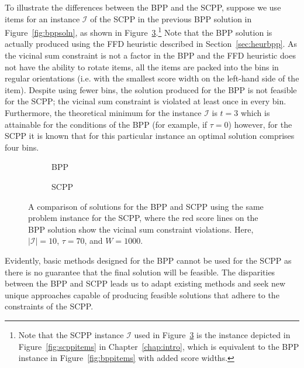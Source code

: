 \documentclass[a4paper,11pt]{article}
\begin{document}
To illustrate the differences between the BPP and the SCPP, suppose we use items for an instance $\mathcal{I}$ of the SCPP in the previous BPP solution in Figure~\ref{fig:bppsoln}, as shown in Figure~\ref{fig:bppvscpp}.\footnote{Note that the SCPP instance $\mathcal{I}$ used in Figure~\ref{fig:bppvscpp} is the instance depicted in Figure~\ref{fig:scppitems} in Chapter~\ref{chap:intro}, which is equivalent to the BPP instance in Figure~\ref{fig:bppitems} with added score widths.} Note that the BPP solution is actually produced using the FFD heuristic described in Section~\ref{sec:heurbpp}. As the vicinal sum constraint is not a factor in the BPP and the FFD heuristic does not have the ability to rotate items, all the items are packed into the bins in regular orientations (i.e. with the smallest score width on the left-hand side of the item). Despite using fewer bins, the solution produced for the BPP is not feasible for the SCPP; the vicinal sum constraint is violated at least once in every bin. Furthermore, the theoretical minimum for the instance $\mathcal{I}$ is $t=3$ which is attainable for the conditions of the BPP (for example, if $\tau = 0$) however, for the SCPP it is known that for this particular instance an optimal solution comprises four bins.

\begin{figure}[h!]
	\centering	
	\begin{subfigure}[h]{0.6\textwidth}
		
		\caption{BPP}
		\label{fig:bppscores}
		\vspace{5mm}
	\end{subfigure} 
	\begin{subfigure}[h]{0.6\textwidth}
		
		\caption{SCPP}
		\label{fig:scppscores}
	\end{subfigure}
	\caption{A comparison of solutions for the BPP and SCPP using the same problem instance for the SCPP, where the red score lines on the BPP solution show the vicinal sum constraint violations. Here, $|\mathcal{I}| = 10$, $\tau = 70$, and $W = 1000$.}	
	\label{fig:bppvscpp}
\end{figure}

\noindent Evidently, basic methods designed for the BPP cannot be used for the SCPP as there is no guarantee that the final solution will be feasible. The disparities between the BPP and SCPP leads us to adapt existing methods and seek new unique approaches capable of producing feasible solutions that adhere to the constraints of the SCPP.
\end{document}
